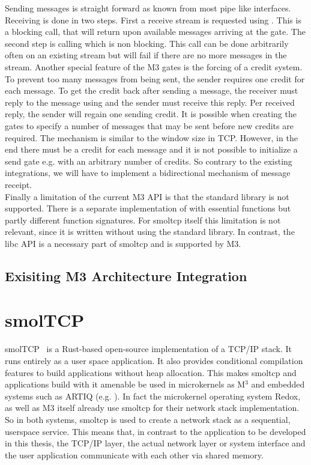 Sending messages is straight forward as known from most pipe like interfaces. Receiving is done in two steps. First a receive stream is requested using . This is a blocking call, that will return upon available  messages arriving at the gate. The second step is calling  which is non blocking. This call can be done arbitrarily often on an existing stream but will fail if there are no more messages in the stream. Another special feature of the M3 gates is the forcing of a credit system. To prevent too many messages from being sent, the sender requires one credit for each message. To get the credit back after sending a message, the receiver must reply to the message using  and the sender must receive this reply. Per received reply, the sender will regain one sending credit. It is possible when creating the gates to specify a number of messages that may be sent before new credits are required. The mechanism is similar to the window size in TCP. However, in the end there must be a credit for each message and it is not possible to initialize a send gate e.g. with an arbitrary number of credits. So contrary to the existing integrations, we will have to implement a bidirectional mechanism of message receipt.\\

Finally a limitation of the current M3 API is that the standard library is not supported. There is a separate implementation of  with essential functions but partly different function signatures. For smoltcp itself this limitation is not relevant, since it is written without using the standard library. In contrast, the libc API is a necessary part of smoltcp and is supported by M3. 

\subsection{Exisiting M3 Architecture Integration}


\section{smolTCP}
smolTCP~\cite{smolTCP} is a Rust-based open-source implementation of a TCP/IP stack. It runs entirely as a user space application. It also provides conditional compilation features to build applications without heap allocation. This makes smoltcp and applications build with it amenable be used in microkernels as M$^3$\cite{Asmussen:M3v} and embedded systems such as ARTIQ (e.g. \cite{lam2021combining}). In fact the microkernel operating system Redox\cite{redoxwebsite}, as well as M3 itself already use smoltcp for their network stack implementation. So in both systems, smoltcp is used to create a network stack as a sequential, userspace service. This means that, in contrast to the application to be developed in this thesis, the TCP/IP layer, the actual network layer or system interface and the user application communicate with each other via shared memory. \\

